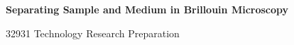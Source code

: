 \documentclass[11pt]{article}
\begin{document}
\hypersetup{pageanchor=false}

\begin{titlepage}
\centering\vspace*{3cm}
{\Huge\bfseries Separating Sample and Medium in Brillouin Microscopy\par}
\vspace{2cm}{\Large Noah Klugman\par}
\vspace{0.3cm}{\large Student ID: 24948806\par}
\vfill{\large 32931 Technology Research Preparation\par}
\vspace{0.3cm}{\large University of Technology Sydney\par}
\vspace{1cm}{\large \today\par}
\end{titlepage}
\hypersetup{pageanchor=true}

\end{document}

